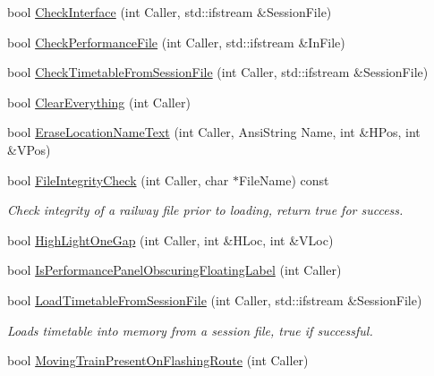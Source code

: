 \begin{DoxyCompactItemize}
bool \mbox{\hyperlink{class_t_interface_ae484cb4ac3ce536b922fff402e6689f7}{Check\+Interface}} (int Caller, std\+::ifstream \&Session\+File)
\item 
bool \mbox{\hyperlink{class_t_interface_ace78190347eb85b1048e5309075d04b0}{Check\+Performance\+File}} (int Caller, std\+::ifstream \&In\+File)
\item 
bool \mbox{\hyperlink{class_t_interface_a1c76c13d451cb6955d77d37e68614811}{Check\+Timetable\+From\+Session\+File}} (int Caller, std\+::ifstream \&Session\+File)
\item 
bool \mbox{\hyperlink{class_t_interface_a686430e962991bc32742399164187b62}{Clear\+Everything}} (int Caller)
\item 
bool \mbox{\hyperlink{class_t_interface_a2bb21fd8e1e90095cf68d63a57e938ec}{Erase\+Location\+Name\+Text}} (int Caller, Ansi\+String Name, int \&H\+Pos, int \&V\+Pos)
\item 
\mbox{\label{class_t_interface_a1072fd152bca3234e6730efa17f84670}} 
bool \mbox{\hyperlink{class_t_interface_a1072fd152bca3234e6730efa17f84670}{File\+Integrity\+Check}} (int Caller, char $\ast$File\+Name) const
\begin{DoxyCompactList}\small\item\em Check integrity of a railway file prior to loading, return true for success. \end{DoxyCompactList}\item 
bool \mbox{\hyperlink{class_t_interface_a44bce128da0e5ae552031e39552d0c39}{High\+Light\+One\+Gap}} (int Caller, int \&H\+Loc, int \&V\+Loc)
\item 
bool \mbox{\hyperlink{class_t_interface_a6aabbfe2ebc6e92d6306697e2940b86c}{Is\+Performance\+Panel\+Obscuring\+Floating\+Label}} (int Caller)
\item 
\mbox{\label{class_t_interface_a92d5a9e07b9362dee2296b7759a1c83d}} 
bool \mbox{\hyperlink{class_t_interface_a92d5a9e07b9362dee2296b7759a1c83d}{Load\+Timetable\+From\+Session\+File}} (int Caller, std\+::ifstream \&Session\+File)
\begin{DoxyCompactList}\small\item\em Loads timetable into memory from a session file, true if successful. \end{DoxyCompactList}\item 
bool \mbox{\hyperlink{class_t_interface_a1cd9f01bcbcc37fb31712b7007d04dac}{Moving\+Train\+Present\+On\+Flashing\+Route}} (int Caller)

\end{DoxyCompactItemize}

